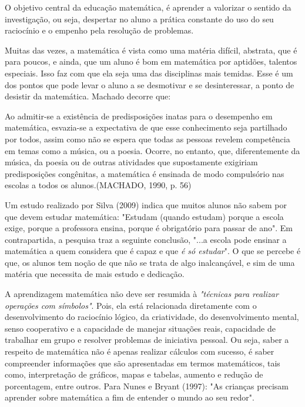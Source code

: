 \documentclass[brasil]{abnt}
\begin{document}
    O objetivo central da educação matemática, é aprender a valorizar o sentido da investigação, ou seja, despertar no aluno a prática constante do uso do seu raciocínio e o empenho pela resolução de problemas.
     
    Muitas das vezes, a matemática é vista como uma matéria difícil, abstrata, que é para poucos, e ainda, que um aluno é bom em matemática por aptidões,
    talentos especiais. Isso faz com que ela seja uma das disciplinas mais temidas. Esse é um dos pontos que pode levar o aluno a se desmotivar e se desinteressar, a ponto de desistir da matemática. 
    Machado decorre que:
    
    \begin{citacao}Ao admitir-se a existência de predisposições inatas para o desempenho em matemática, esvazia-se a expectativa de que esse conhecimento seja
				partilhado por todos, assim como não se espera que todas as pessoas revelem competência em temas como a música, ou a poesia. Ocorre, no entanto,
				que, diferentemente da música, da poesia ou de outras atividades que supostamente exigiriam predisposições congênitas, a matemática é ensinada de modo
				compulsório nas escolas a todos os alunos.(MACHADO, 1990, p. 56)
	\end{citacao}
		 
    Um estudo realizado por Silva (2009) indica que muitos alunos não sabem por que devem estudar matemática: "Estudam (quando estudam) porque a escola exige, porque a professora ensina, porque é 
    obrigatório para passar de ano". Em contrapartida, a pesquisa traz a seguinte conclusão, "...a escola pode ensinar a matemática a quem considera que é capaz e que \textit{é só estudar}". O que se percebe 
    é que, os alunos tem noção de que não se trata de algo inalcançável, e sim de uma matéria que necessita de mais estudo e dedicação.
	
	A aprendizagem matemática não deve ser resumida à \textit{"técnicas para realizar operações com símbolos"}. Pois, ela está relacionada diretamente com o desenvolvimento do raciocínio lógico, da 
	criatividade, do desenvolvimento mental, senso cooperativo e a capacidade de manejar situações reais, capacidade de trabalhar em grupo e resolver problemas de iniciativa pessoal. 
	Ou seja, saber a respeito de matemática não é apenas realizar cálculos com sucesso, é saber compreender informações que são apresentadas em termos matemáticos, tais como, interpretação de gráficos, 
	mapas e tabelas, aumento e redução de porcentagem, entre outros. Para Nunes e Bryant (1997): "As crianças precisam aprender sobre matemática a fim de entender o mundo ao seu redor".
			
\end{document}
